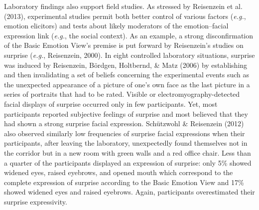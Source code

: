 \documentclass[man]{apa6}
\begin{document}
Laboratory findings also support field studies. As stressed by Reisenzein et al. (2013), experimental studies permit both better control of various factors (\emph{e.g.}, emotion elicitors) and tests about likely moderators of the emotion--facial expression link (\emph{e.g.}, the social context). As an example, a strong disconfirmation of the Basic Emotion View's premise is put forward by Reisenzein's studies on surprise (\emph{e.g.}, Reisenzein, 2000). In eight controlled laboratory situations, surprise was induced by Reisenzein, Bördgen, Holtbernd, \& Matz (2006) by establishing and then invalidating a set of beliefs concerning the experimental events such as the unexpected appearance of a picture of one's own face as the last picture in a series of portraits that had to be rated. Visible or electromyography-detected facial displays of surprise occurred only in few participants. Yet, most participants reported subjective feelings of surprise and most believed that they had shown a strong surprise facial expression. Schützwohl \& Reisenzein (2012) also observed similarly low frequencies of surprise facial expressions when their participants, after leaving the laboratory, unexpectedly found themselves not in the corridor but in a new room with green walls and a red office chair. Less than a quarter of the participants displayed an expression of surprise: only 5\% showed widened eyes, raised eyebrows, and opened mouth which correspond to the complete expression of surprise according to the Basic Emotion View and 17\% showed widened eyes and raised eyebrows. Again, participants overestimated their surprise expressivity.
\end{document}
